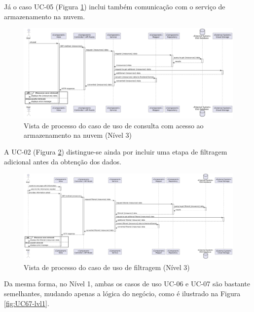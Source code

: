Já o caso UC-05 (Figura \ref{fig:UC5-lvl3}) inclui também comunicação com o serviço de armazenamento na nuvem.

\begin{figure}[H]
\centering
\includegraphics[width=\linewidth]{frontmatter/assets/diagrams/Process Views/LVL3/uc-05-lvl3.png}
\caption{Vista de processo do caso de uso de consulta com acesso ao armazenamento na nuvem (Nível 3)}
\label{fig:UC5-lvl3}
\end{figure}

A UC-02 (Figura \ref{fig:UC2-lvl3}) distingue-se ainda por incluir uma etapa de filtragem adicional antes da obtenção dos dados.

\begin{figure}[H]
\centering
\includegraphics[width=\linewidth]{frontmatter/assets/diagrams/Process Views/LVL3/uc-02-lvl3.png}
\caption{Vista de processo do caso de uso de filtragem (Nível 3)}
\label{fig:UC2-lvl3}
\end{figure}

Da mesma forma, no Nível 1, ambas os casos de uso UC-06 e UC-07 são bastante semelhantes, mudando apenas a lógica do negócio, como é ilustrado na Figura \ref{fig:UC67-lvl1}.

